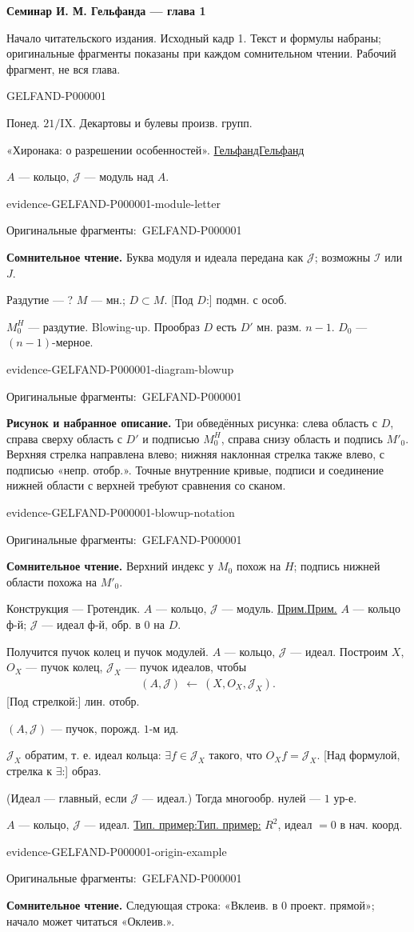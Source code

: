 \documentclass[11pt]{article}
\let\MathUnderline\underline
\renewcommand{\underline}[1]{\ifmmode\MathUnderline{#1}\else\uline{#1}\fi}
\newcommand{\SourcePage}[2]{\par\smallskip\phantomsection\label{#1:source-page}{\small\sffamily\color{blue!55!black}#1}\par\smallskip}
\newcommand{\EvidenceBlock}[4]{%
 \par\smallskip\noindent\begin{minipage}{\linewidth}
 \begin{minipage}[t]{.47\linewidth}\vspace{0pt}\centering
 \csname evidence-#1-#2\endcsname\par
 {\scriptsize\SourceCropCaption\ #1}\par
 \end{minipage}\hfill
 \begin{minipage}[t]{.49\linewidth}\vspace{0pt}\raggedright
 {\small\color{orange!65!black}\textbf{#4} #3}\par
 \end{minipage}
 \end{minipage}\par\smallskip}
\newcommand{\Unclear}[3]{\EvidenceBlock{#1}{#2}{#3}{\ReadingCaption}}
\newcommand{\SourceFigure}[3]{\EvidenceBlock{#1}{#2}{#3}{\DiagramCaption}}
\newcommand{\SourceCropCaption}{Оригинальные фрагменты:}\newcommand{\ReadingCaption}{Сомнительное чтение.}\newcommand{\IncompleteCaption}{Неразобранный фрагмент.}\newcommand{\DiagramCaption}{Рисунок и набранное описание.}
\begin{document}
{\large\bfseries Семинар И. М. Гельфанда — глава 1}\par
{\small Начало читательского издания. Исходный кадр 1. Текст и формулы набраны; оригинальные фрагменты показаны при каждом сомнительном чтении. Рабочий фрагмент, не вся глава.}\par\medskip
\SourcePage{GELFAND-P000001}{unlabelled}
Понед. $21/\mathrm{IX}$.
Декартовы и булевы произв. групп.

«Хиронака: о разрешении особенностей».
\underline{Гельфанд}

$A$ — кольцо, $\mathcal{J}$ — модуль над $A$.
\Unclear{GELFAND-P000001}{module-letter}{Буква модуля и идеала передана как $\mathcal{J}$; возможны $\mathcal{I}$ или $J$.}

Раздутие — ?
$M$ — мн.; $D\subset M$.
[Под $D$:] подмн. с особ.

$M_0^H$ — раздутие. Blowing-up.
Прообраз $D$ есть $D'$ мн. разм. $n-1$.
$D_0$ — $(n-1)$-мерное.
\SourceFigure{GELFAND-P000001}{diagram-blowup}{Три обведённых рисунка: слева область с $D$, справа сверху область с $D'$ и подписью $M_0^H$, справа снизу область и подпись $M'_0$. Верхняя стрелка направлена влево; нижняя наклонная стрелка также влево, с подписью «непр. отобр.». Точные внутренние кривые, подписи и соединение нижней области с верхней требуют сравнения со сканом.}
\Unclear{GELFAND-P000001}{blowup-notation}{Верхний индекс у $M_0$ похож на $H$; подпись нижней области похожа на $M'_0$.}

Конструкция — Гротендик.
$A$ — кольцо, $\mathcal{J}$ — модуль.
\underline{Прим.} $A$ — кольцо ф-й;
$\mathcal{J}$ — идеал ф-й, обр. в $0$ на $D$.

Получится пучок колец и пучок модулей.
$A$ — кольцо, $\mathcal{J}$ — идеал.
Построим $X$, $O_X$ — пучок колец,
$\mathcal{J}_X$ — пучок идеалов, чтобы
\begin{gather*}
 (A,\mathcal{J})\ \longleftarrow\ (X,O_X,\mathcal{J}_X).
\end{gather*}
[Под стрелкой:] лин. отобр.

$(A,\mathcal{J})$ — пучок, порожд. $1$-м ид.

$\mathcal{J}_X$ обратим, т. е. идеал кольца:
$\exists f\in\mathcal{J}_X$ такого, что $O_Xf=\mathcal{J}_X$.
[Над формулой, стрелка к $\exists$:] образ.

(Идеал — главный, если $\mathcal{J}$ — идеал.)
Тогда многообр. нулей — $1$ ур-е.

$A$ — кольцо, $\mathcal{J}$ — идеал.
\underline{Тип. пример:} $R^2$, идеал $=0$ в нач. коорд.
\Unclear{GELFAND-P000001}{origin-example}{Следующая строка: «Вклеив. в $0$ проект. прямой»; начало может читаться «Оклеив.».}
\end{document}
